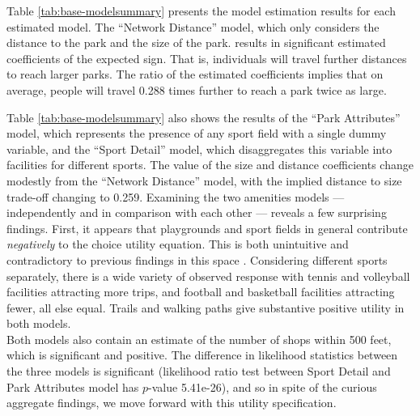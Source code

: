 \documentclass[3p, authoryear, review]{elsarticle} %
\begin{document}
Table \ref{tab:base-modelsummary} presents the model estimation results for
each estimated model. The ``Network Distance'' model, which only considers the
distance to the park and the size of the park. results in significant estimated
coefficients of the expected sign. That is, individuals will travel further
distances to reach larger parks. The ratio of the estimated coefficients implies
that on average, people will travel 0.288 times further to reach a park
twice as large.

Table \ref{tab:base-modelsummary} also shows the results of the ``Park
Attributes'' model, which represents the presence of any sport field with a
single dummy variable, and the ``Sport Detail'' model, which disaggregates this
variable into facilities for different sports. The value of the size and
distance coefficients change modestly from the ``Network Distance'' model, with
the implied distance to size trade-off changing to 0.259. Examining
the two amenities models --- independently and in comparison with each other ---
reveals a few surprising findings. First, it appears that playgrounds and sport
fields in general contribute \emph{negatively} to the choice utility equation. This
is both unintuitive and contradictory to previous findings in this space \citep[e.g.,][]{Kinnell2006}. Considering different sports separately, there is a wide variety
of observed response with tennis and volleyball facilities attracting more
trips, and football and basketball facilities attracting fewer, all else equal.
Trails and walking paths give substantive positive utility in both models.\\
Both models also contain an estimate of the number of shops within 500 feet,
which is significant and positive. The
difference in likelihood statistics between the three models is significant
(likelihood ratio test between Sport Detail and Park Attributes model has
\(p\)-value 5.41e-26), and so in spite of the curious aggregate findings,
we move forward with this utility specification.
\end{document}
